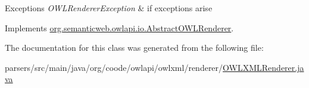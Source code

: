 \begin{DoxyExceptions}{Exceptions}
{\em O\-W\-L\-Renderer\-Exception} & if exceptions arise \\
\hline
\end{DoxyExceptions}


Implements \hyperlink{classorg_1_1semanticweb_1_1owlapi_1_1io_1_1_abstract_o_w_l_renderer_af63991e15c4b152e1f8013582c119bf5}{org.\-semanticweb.\-owlapi.\-io.\-Abstract\-O\-W\-L\-Renderer}.



The documentation for this class was generated from the following file\-:\begin{DoxyCompactItemize}
\item 
parsers/src/main/java/org/coode/owlapi/owlxml/renderer/\hyperlink{_o_w_l_x_m_l_renderer_8java}{O\-W\-L\-X\-M\-L\-Renderer.\-java}\end{DoxyCompactItemize}
